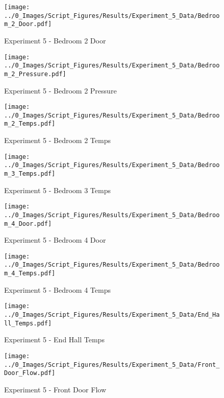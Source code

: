 	\clearpage

	\begin{figure}[H]
		\centering
		\texttt{[image: ../0\_Images/Script\_Figures/Results/Experiment\_5\_Data/Bedroom\_2\_Door.pdf]}
		\caption[]{Experiment 5 - Bedroom 2 Door}
	\end{figure}
 

	\begin{figure}[H]
		\centering
		\texttt{[image: ../0\_Images/Script\_Figures/Results/Experiment\_5\_Data/Bedroom\_2\_Pressure.pdf]}
		\caption[]{Experiment 5 - Bedroom 2 Pressure}
	\end{figure}
 
	\clearpage

	\begin{figure}[H]
		\centering
		\texttt{[image: ../0\_Images/Script\_Figures/Results/Experiment\_5\_Data/Bedroom\_2\_Temps.pdf]}
		\caption[]{Experiment 5 - Bedroom 2 Temps}
	\end{figure}
 

	\begin{figure}[H]
		\centering
		\texttt{[image: ../0\_Images/Script\_Figures/Results/Experiment\_5\_Data/Bedroom\_3\_Temps.pdf]}
		\caption[]{Experiment 5 - Bedroom 3 Temps}
	\end{figure}
 
	\clearpage

	\begin{figure}[H]
		\centering
		\texttt{[image: ../0\_Images/Script\_Figures/Results/Experiment\_5\_Data/Bedroom\_4\_Door.pdf]}
		\caption[]{Experiment 5 - Bedroom 4 Door}
	\end{figure}
 

	\begin{figure}[H]
		\centering
		\texttt{[image: ../0\_Images/Script\_Figures/Results/Experiment\_5\_Data/Bedroom\_4\_Temps.pdf]}
		\caption[]{Experiment 5 - Bedroom 4 Temps}
	\end{figure}
 
	\clearpage

	\begin{figure}[H]
		\centering
		\texttt{[image: ../0\_Images/Script\_Figures/Results/Experiment\_5\_Data/End\_Hall\_Temps.pdf]}
		\caption[]{Experiment 5 - End Hall Temps}
	\end{figure}
 

	\begin{figure}[H]
		\centering
		\texttt{[image: ../0\_Images/Script\_Figures/Results/Experiment\_5\_Data/Front\_Door\_Flow.pdf]}
		\caption[]{Experiment 5 - Front Door Flow}
	\end{figure}
 
